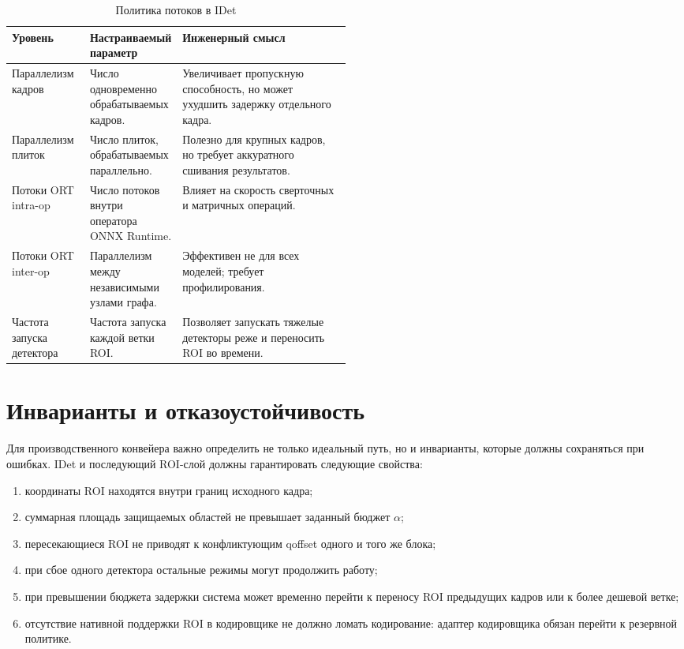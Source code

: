 \documentclass[12pt,a4paper,oneside,openany]{report}
\begin{document}
\begin{table}[!htbp]
  \centering
  \caption{Политика потоков в IDet}
  \label{tab:threading_policy}
  \small
  \begin{tabularx}{\linewidth}{@{}P{0.23\linewidth}P{0.27\linewidth}Y@{}}
    \toprule
    Уровень & Настраиваемый параметр & Инженерный смысл \\
    \midrule
    Параллелизм кадров &
    Число одновременно обрабатываемых кадров. &
    Увеличивает пропускную способность, но может ухудшить задержку отдельного кадра. \\
    Параллелизм плиток &
    Число плиток, обрабатываемых параллельно. &
    Полезно для крупных кадров, но требует аккуратного сшивания результатов. \\
    Потоки ORT intra-op &
    Число потоков внутри оператора ONNX Runtime. &
    Влияет на скорость сверточных и матричных операций. \\
    Потоки ORT inter-op &
    Параллелизм между независимыми узлами графа. &
    Эффективен не для всех моделей; требует профилирования. \\
    Частота запуска детектора &
    Частота запуска каждой ветки ROI. &
    Позволяет запускать тяжелые детекторы реже и переносить ROI во времени. \\
    \bottomrule
  \end{tabularx}
\end{table}


\section{Инварианты и отказоустойчивость}

Для производственного конвейера важно определить не только идеальный путь, но и инварианты,
которые должны сохраняться при ошибках. IDet и последующий ROI-слой должны гарантировать
следующие свойства:
\begin{enumerate}[label=\arabic*)]
  \item координаты ROI находятся внутри границ исходного кадра;
  \item суммарная площадь защищаемых областей не превышает заданный бюджет $\alpha$;
  \item пересекающиеся ROI не приводят к конфликтующим qoffset одного и того же блока;
  \item при сбое одного детектора остальные режимы могут продолжить работу;
  \item при превышении бюджета задержки система может временно перейти к переносу ROI предыдущих
      кадров или к более дешевой ветке;
  \item отсутствие нативной поддержки ROI в кодировщике не должно ломать кодирование: адаптер
      кодировщика обязан перейти к резервной политике.
\end{enumerate}
\end{document}
